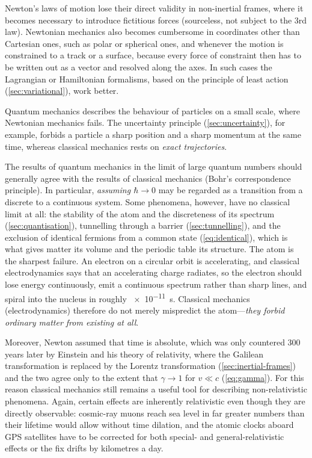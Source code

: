         Newton's laws of motion lose their direct validity in non-inertial frames, where it becomes necessary to introduce fictitious forces (sourceless, not subject to the 3rd law). Newtonian mechanics also becomes cumbersome in coordinates other than Cartesian ones, such as polar or spherical ones, and whenever the motion is constrained to a track or a surface, because every force of constraint then has to be written out as a vector and resolved along the axes. In such cases the Lagrangian or Hamiltonian formalisms, based on the principle of least action (\cref{sec:variational}), work better.

        Quantum mechanics describes the behaviour of particles on a small scale, where Newtonian mechanics fails. The uncertainty principle (\cref{sec:uncertainty}), for example, forbids a particle a sharp position and a sharp momentum at the same time, whereas classical mechanics rests on \emph{exact trajectories}.

        The results of quantum mechanics in the limit of large quantum numbers should generally agree with the results of classical mechanics (Bohr's correspondence principle). In particular, \emph{assuming $\hbar \to 0$} may be regarded as a transition from a discrete to a continuous system. Some phenomena, however, have no classical limit at all: the stability of the atom and the discreteness of its spectrum (\cref{sec:quantisation}), tunnelling through a barrier (\cref{sec:tunnelling}), and the exclusion of identical fermions from a common state (\cref{eq:identical}), which is what gives matter its volume and the periodic table its structure. The atom is the sharpest failure. An electron on a circular orbit is accelerating, and classical electrodynamics says that an accelerating charge radiates, so the electron should lose energy continuously, emit a continuous spectrum rather than sharp lines, and spiral into the nucleus in roughly \qty{e-11}{\second}. Classical mechanics (electrodynamics) therefore do not merely mispredict the atom---\emph{they forbid ordinary matter from existing at all}.

        Moreover, Newton assumed that time is absolute, which was only countered 300 years later by Einstein and his theory of relativity, where the Galilean transformation is replaced by the Lorentz transformation (\cref{sec:inertial-frames}) and the two agree only to the extent that $\gamma \to 1$ for $v \ll c$ (\cref{eq:gamma}). For this reason classical mechanics still remains a useful tool for describing non-relativistic phenomena. Again, certain effects are inherently relativistic even though they are directly observable: cosmic-ray muons reach sea level in far greater numbers than their lifetime would allow without time dilation, and the atomic clocks aboard GPS satellites have to be corrected for both special- and general-relativistic effects or the fix drifts by kilometres a day.

